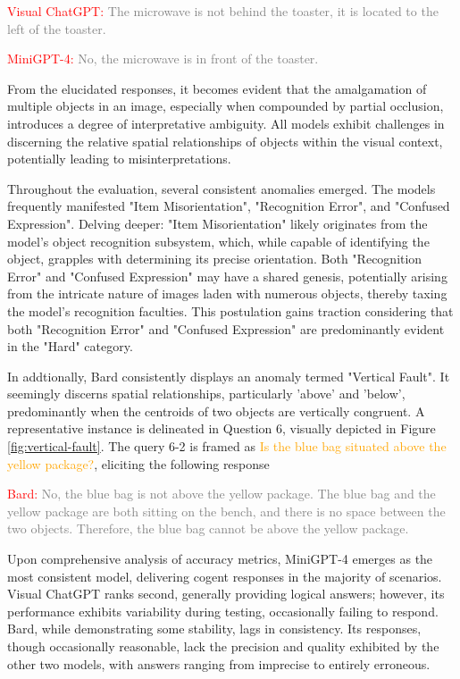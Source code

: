 \documentclass[journal,10pt]{IEEEtran}
\begin{document}
\textcolor{red}{Visual ChatGPT:} \textcolor{gray}{The microwave is not behind the toaster, it is located to the left of the toaster.}

\textcolor{red}{MiniGPT-4:} \textcolor{gray}{No, the microwave is in front of the toaster.}

From the elucidated responses, it becomes evident that the amalgamation of multiple objects in an image, especially when compounded by partial occlusion, introduces a degree of interpretative ambiguity. All models exhibit challenges in discerning the relative spatial relationships of objects within the visual context, potentially leading to misinterpretations.

Throughout the evaluation, several consistent anomalies emerged. The models frequently manifested "Item Misorientation", "Recognition Error", and "Confused Expression". Delving deeper: "Item Misorientation" likely originates from the model's object recognition subsystem, which, while capable of identifying the object, grapples with determining its precise orientation. Both "Recognition Error" and "Confused Expression" may have a shared genesis, potentially arising from the intricate nature of images laden with numerous objects, thereby taxing the model's recognition faculties. This postulation gains traction considering that both "Recognition Error" and "Confused Expression" are predominantly evident in the "Hard" category.

In addtionally, Bard consistently displays an anomaly termed "Vertical Fault". It seemingly discerns spatial relationships, particularly 'above' and 'below', predominantly when the centroids of two objects are vertically congruent. A representative instance is delineated in Question 6, visually depicted in Figure \ref{fig:vertical-fault}. The query 6-2 is framed as \textcolor{orange}{Is the blue bag situated above the yellow package?}, eliciting the following response

\textcolor{red}{Bard:} \textcolor{gray}{No, the blue bag is not above the yellow package. The blue bag and the yellow package are both sitting on the bench, and there is no space between the two objects. Therefore, the blue bag cannot be above the yellow package.}

Upon comprehensive analysis of accuracy metrics, MiniGPT-4 emerges as the most consistent model, delivering cogent responses in the majority of scenarios. Visual ChatGPT ranks second, generally providing logical answers; however, its performance exhibits variability during testing, occasionally failing to respond. Bard, while demonstrating some stability, lags in consistency. Its responses, though occasionally reasonable, lack the precision and quality exhibited by the other two models, with answers ranging from imprecise to entirely erroneous.
\end{document}
